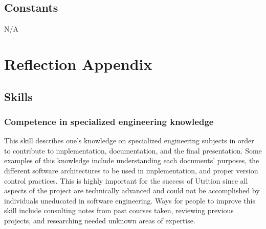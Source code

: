 \documentclass[12pt]{article}
\begin{document}
\noindent {}

\subsection{Constants}
N/A

\section{Reflection Appendix}
\subsection{Skills}
\subsubsection{Competence in specialized engineering knowledge}
This skill describes one's knowledge on specialized engineering subjects in order to contribute to implementation, documentation, and the final presentation. Some examples of this knowledge include understanding each documents' purposes, the different software architectures to be used in implementation, and proper version control practices. This is highly important for the success of Utrition since all aspects of the project are technically advanced and could not be accomplished by individuals uneducated in software engineering. Ways for people to improve this skill include consulting notes from past courses taken, reviewing previous projects, and researching needed unknown areas of expertise.
\end{document}
